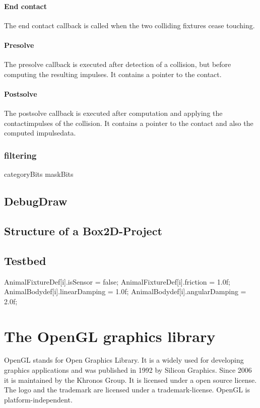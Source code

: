 \documentclass[10pt,a4paper,DIV=11]{scrreprt}
\begin{document}
\subsubsection*{End contact}
The end contact callback is called when the two colliding fixtures cease touching.

\subsubsection*{Presolve}
The presolve callback is executed after detection of a collision, but before computing the resulting impulses. It contains a pointer to the contact.

\subsubsection*{Postsolve}
The postsolve callback is executed after computation and applying the contactimpulses of the collision. It contains a pointer to the contact and also the computed impulsedata.

\subsection{filtering}
categoryBits
maskBits


\section{DebugDraw}


\section{Structure of a Box2D-Project}




\section{Testbed}


AnimalFixtureDef[i].isSensor = false;
AnimalFixtureDef[i].friction = 1.0f;
AnimalBodydef[i].linearDamping = 1.0f;
AnimalBodydef[i].angularDamping = 2.0f;

\chapter{The OpenGL graphics library}
OpenGL stands for Open Graphics Library. It is a widely used for developing graphics applications and was published in 1992 by Silicon Graphics. Since 2006 it is maintained by the Khronos Group. It is licensed under a open source license. The logo and the trademark are licensed under a trademark-license.
OpenGL is platform-independent.
\end{document}
